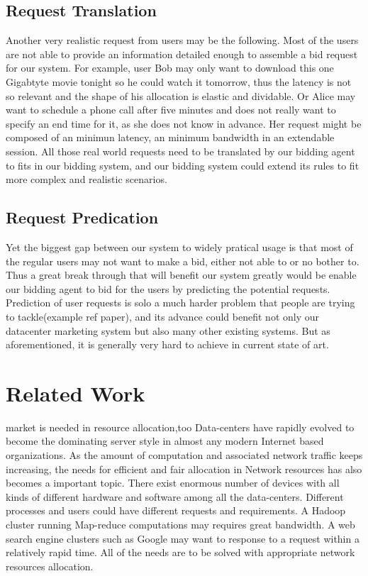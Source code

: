 \documentclass[a4paper,11pt,twocolumn]{article}
\begin{document}
\subsection{ Request Translation}
Another very realistic request from users may be the following. 
Most of the users are not able to provide an information detailed enough to assemble a bid request for our system. 
For example, user Bob may only want to download this one Gigabtyte movie tonight so he could watch it tomorrow, 
thus the latency is not so relevant and the shape of his allocation is elastic and dividable. Or 
Alice may want to schedule a phone call  after five minutes and does not really want to specify an end time for it, 
as she does not know in advance. Her request might be composed of an minimun latency, an minimum bandwidth in an extendable session. 
All those real world requests need to be translated by our bidding agent to fits in our bidding system, and our bidding system
 could extend its rules to fit more complex and realistic scenarios. 

\subsection{ Request Predication}
Yet the biggest gap between our system to widely pratical usage is that most of the regular users may not want to make a bid, 
either not able to or no bother to. Thus a great break through that will benefit our system greatly would be enable our bidding
 agent to bid for the users by predicting the potential requests.  Prediction of user requests is solo a much harder problem that 
people are trying to tackle(example ref paper), and its advance could benefit not only our datacenter marketing system but also many 
other existing systems. But as aforementioned, it is generally very hard to achieve in current state of art.



\section{Related Work}
 market is needed in resource allocation,too
Data-centers have rapidly evolved to become the dominating server style in almost
any modern Internet based organizations. As the amount of computation and associated
network  traffic keeps increasing, the needs for efficient and fair  allocation in  Network resources
has also becomes a important topic. There exist enormous number of devices with all 
kinds of different hardware and software among all the data-centers. Different processes and users could
have different requests and requirements. A Hadoop cluster running Map-reduce computations 
may requires great bandwidth.
A web search engine clusters such as Google may want to response to a request 
within a relatively rapid time. All of the needs are to be solved with appropriate network resources
allocation.
\end{document}
